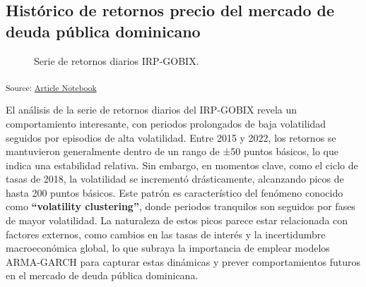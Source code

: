 \documentclass[
  number,
  preprint,
  3p,
  onecolumn]{elsarticle}
\begin{document}
\subsection{Histórico de retornos precio del mercado de deuda pública
dominicano}\label{sec-historico-retornos}

\begin{figure}[H]


\caption{\label{fig-price-return-series}Serie de retornos diarios
IRP-GOBIX.}

\end{figure}%

\textsubscript{Source:
\href{https://iancont.github.io/fixed_income_garch/index-preview.html}{Article
Notebook}}

El análisis de la serie de retornos diarios del IRP-GOBIX revela un
comportamiento interesante, con periodos prolongados de baja volatilidad
seguidos por episodios de alta volatilidad. Entre 2015 y 2022, los
retornos se mantuvieron generalmente dentro de un rango de ±50 puntos
básicos, lo que indica una estabilidad relativa. Sin embargo, en
momentos clave, como el ciclo de tasas de 2018, la volatilidad se
incrementó drásticamente, alcanzando picos de hasta 200 puntos básicos.
Este patrón es característico del fenómeno conocido como
\textbf{``volatility clustering''}, donde periodos tranquilos son
seguidos por fases de mayor volatilidad. La naturaleza de estos picos
parece estar relacionada con factores externos, como cambios en las
tasas de interés y la incertidumbre macroeconómica global, lo que
subraya la importancia de emplear modelos ARMA-GARCH para capturar estas
dinámicas y prever comportamientos futuros en el mercado de deuda
pública dominicana.
\end{document}
